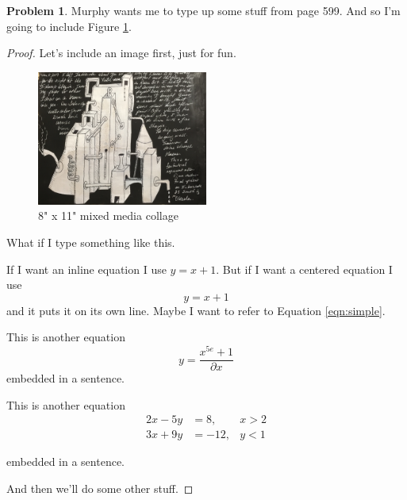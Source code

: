 \documentclass[12pt]{article}
\theoremstyle{definition}
\newtheorem{problem}{Problem}
\begin{document}
\begin{problem}
Murphy wants me to type up some stuff from page 599. And so I'm going to include Figure \ref{fig:Jam1}.

\begin{proof}
Let's include an image first, just for fun.

\begin{figure}[h]
    \centering
    \includegraphics[width=0.5\textwidth]{Week1Jamie1.jpg}
    \caption{8" x 11" mixed media collage}
    \label{fig:Jam1}
\end{figure}

What 
if I 
type
something                            like this.

If I want an inline equation I use $y = x + 1$.  But if I want a centered equation I use $$y = x + 1$$ and it puts it on its own line. Maybe I want to refer to Equation \ref{eqn:simple}.

This is another equation
\begin{equation}
    \label{eqn:simple}
    y = \frac{x^{5e} + 1}{\partial x}
\end{equation}
embedded in a sentence.

This is another equation
\begin{align} 
2x - 5y &=  8 ,&x > 2\\    3x + 9y &=  -12 ,& y <1
\end{align}

embedded in a sentence.

And then we'll do some other stuff.
\end{proof}
\end{problem}
\end{document}
